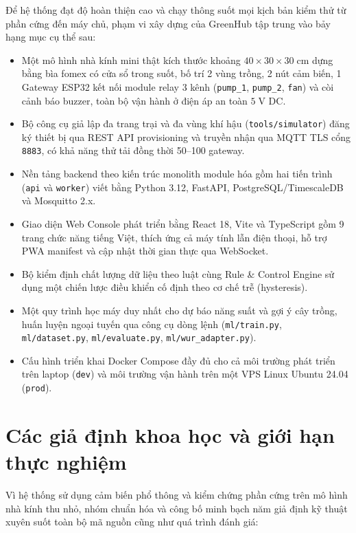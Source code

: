 Để hệ thống đạt độ hoàn thiện cao và chạy thông suốt mọi kịch bản kiểm thử từ phần cứng đến máy chủ, phạm vi xây dựng của GreenHub tập trung vào bảy hạng mục cụ thể sau:

\begin{itemize}[leftmargin=*]
    \item Một mô hình nhà kính mini thật kích thước khoảng \(40 \times 30 \times 30\;\text{cm}\) dựng bằng bìa fomex có cửa sổ trong suốt, bố trí 2 vùng trồng, 2 nút cảm biến, 1 Gateway ESP32 kết nối module relay 3 kênh (\texttt{pump\_1}, \texttt{pump\_2}, \texttt{fan}) và còi cảnh báo buzzer, toàn bộ vận hành ở điện áp an toàn \(5\;\text{V DC}\).
    \item Bộ công cụ giả lập đa trang trại và đa vùng khí hậu (\texttt{tools/simulator}) đăng ký thiết bị qua REST API provisioning và truyền nhận qua MQTT TLS cổng \texttt{8883}, có khả năng thử tải đồng thời 50--100 gateway.
    \item Nền tảng backend theo kiến trúc monolith module hóa gồm hai tiến trình (\texttt{api} và \texttt{worker}) viết bằng Python 3.12, FastAPI, PostgreSQL/TimescaleDB và Mosquitto 2.x.
    \item Giao diện Web Console phát triển bằng React 18, Vite và TypeScript gồm 9 trang chức năng tiếng Việt, thích ứng cả máy tính lẫn điện thoại, hỗ trợ PWA manifest và cập nhật thời gian thực qua WebSocket.
    \item Bộ kiểm định chất lượng dữ liệu theo luật cùng Rule \& Control Engine sử dụng một chiến lược điều khiển cố định theo cơ chế trễ (hysteresis).
    \item Một quy trình học máy duy nhất cho dự báo năng suất và gợi ý cây trồng, huấn luyện ngoại tuyến qua công cụ dòng lệnh (\texttt{ml/train.py}, \texttt{ml/dataset.py}, \texttt{ml/evaluate.py}, \texttt{ml/wur\_adapter.py}).
    \item Cấu hình triển khai Docker Compose đầy đủ cho cả môi trường phát triển trên laptop (\texttt{dev}) và môi trường vận hành trên một VPS Linux Ubuntu 24.04 (\texttt{prod}).
\end{itemize}

\section{Các giả định khoa học và giới hạn thực nghiệm}
\label{sec:c1-assumptions}

Vì hệ thống sử dụng cảm biến phổ thông và kiểm chứng phần cứng trên mô hình nhà kính thu nhỏ, nhóm chuẩn hóa và công bố minh bạch năm giả định kỹ thuật xuyên suốt toàn bộ mã nguồn cũng như quá trình đánh giá:

